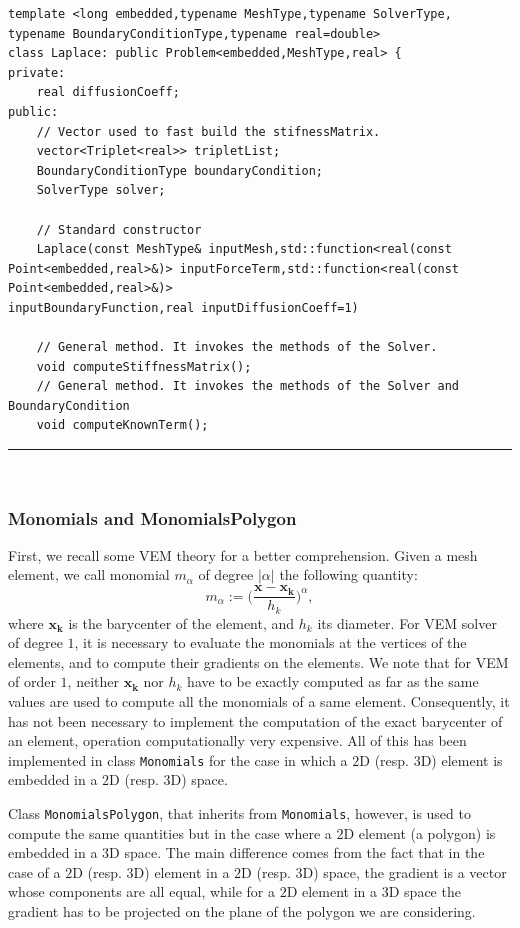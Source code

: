 \begin{lstlisting}[caption=File \texttt{Laplace.h}]
template <long embedded,typename MeshType,typename SolverType,
typename BoundaryConditionType,typename real=double>
class Laplace: public Problem<embedded,MeshType,real> {
private:
    real diffusionCoeff;	
public:
    // Vector used to fast build the stifnessMatrix.
    vector<Triplet<real>> tripletList; 
    BoundaryConditionType boundaryCondition;
    SolverType solver;

    // Standard constructor
    Laplace(const MeshType& inputMesh,std::function<real(const 
Point<embedded,real>&)> inputForceTerm,std::function<real(const 
Point<embedded,real>&)> 
inputBoundaryFunction,real inputDiffusionCoeff=1)

    // General method. It invokes the methods of the Solver.
    void computeStiffnessMatrix();
    // General method. It invokes the methods of the Solver and BoundaryCondition 
    void computeKnownTerm();
\end{lstlisting}
\noindent\rule{16cm}{1pt}\\

\subsubsection{Monomials and MonomialsPolygon}
First, we recall some VEM theory for a better comprehension. Given a mesh element, we call monomial $m_\alpha$ of degree $|\alpha|$ the following quantity:
$$
m_\alpha:=\bigg( \frac{\mathbf{x}-\mathbf{x_k}}{h_k} \bigg) ^\alpha,
$$
where $\mathbf{x_k}$ is the barycenter of the element, and $h_k$ its diameter. For VEM solver of degree $1$, it is necessary to evaluate the monomials at the vertices of the elements, and to compute their gradients on the elements. 
We note that for VEM of order $1$, neither $\mathbf{x_k}$ nor $h_k$ have to be exactly computed as far as the same values are used to compute all the monomials of a same element. Consequently, it has not been necessary to implement the computation of the exact barycenter of an element, operation computationally very expensive. 
All of this has been implemented in class \verb|Monomials| for the case in which a $2$D (resp. $3$D) element is embedded in a $2$D (resp. $3$D) space.

Class \verb|MonomialsPolygon|, that inherits from  \verb|Monomials|, however, is used to compute the same quantities but in the case where a $2$D element (a polygon) is embedded in a $3$D space. The main difference comes from the fact that in the case of a $2$D (resp. $3$D) element in a $2$D (resp. $3$D) space, the gradient is a vector whose components are all equal, while for a $2$D element in a $3$D space the gradient has to be projected on the plane of the polygon we are considering.\\

